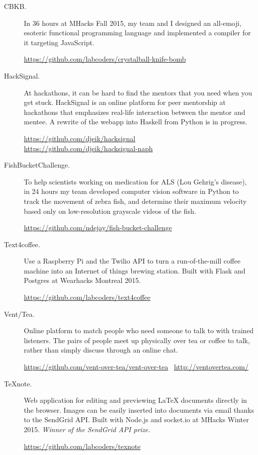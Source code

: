 \documentclass{article}
\begin{document}
\begin{description}
    \item[CBKB.] In 36 hours at MHacks Fall 2015, my team and I designed an
        all-emoji, esoteric functional programming language and implemented
        a compiler for it targeting JavaScript.

        \url{https://github.com/labcoders/crystalball-knife-bomb}

    \item[HackSignal.] At hackathons, it can be hard to find the mentors that
        you need when you get stuck. HackSignal is an online platform for peer
        mentorship at hackathons that emphasizes real-life interaction between
        the mentor and mentee. A rewrite of the webapp into Haskell from Python
        is in progress.

        \url{https://github.com/djeik/hacksignal}~
        \url{https://github.com/djeik/hacksignal-naph}

    \item[FishBucketChallenge.] To help scientists working on medication for
        ALS (Lou Gehrig's disease), in 24 hours my team developed computer
        vision software in Python to track the movement of zebra fish, and
        determine their maximum velocity based only on low-resolution grayscale
        videos of the fish.

        \url{https://github.com/ndejay/fish-bucket-challenge}

    \item[Text4coffee.] Use a Raspberry Pi and the Twilio API to turn a
        run-of-the-mill coffee machine into an Internet of things brewing
        station. Built with Flask and Postgres at Wearhacks Montreal 2015.

        \url{https://github.com/labcoders/text4coffee}

    \item[Vent/Tea.] Online platform to match people who need someone to talk
        to with trained listeners. The pairs of people meet up physically over
        tea or coffee to talk, rather than simply discuss through an online
        chat.

        \url{https://github.com/vent-over-tea/vent-over-tea}~
        \url{http://ventovertea.com/}

    \item[TeXnote.] Web application for editing and previewing \LaTeX{} documents
        directly in the browser. Images can be easily inserted into documents
        via email thanks to the SendGrid API. Built with Node.js and
        socket.io at MHacks Winter 2015.
        \emph{Winner of the SendGrid API prize.}

        \url{https://github.com/labcoders/texnote}
\end{description}
\end{document}
